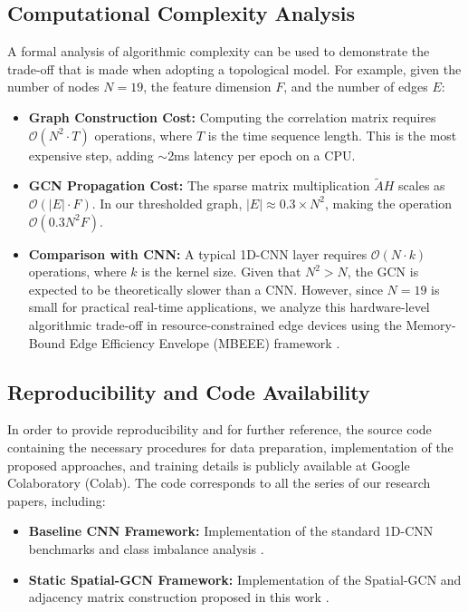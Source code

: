 \documentclass[journal]{IEEEtran}
\begin{document}
\subsection{Computational Complexity Analysis}
A formal analysis of algorithmic complexity can be used to demonstrate the trade-off that is made when adopting a topological model. For example, given the number of nodes $N=19$, the feature dimension $F$, and the number of edges $E$:
\begin{itemize}
    \item \textbf{Graph Construction Cost:} Computing the correlation matrix requires $\mathcal{O}(N^2 \cdot T)$ operations, where $T$ is the time sequence length. This is the most expensive step, adding $\sim$2ms latency per epoch on a CPU.
    \item \textbf{GCN Propagation Cost:} The sparse matrix multiplication $\tilde{A}H$ scales as $\mathcal{O}(|E| \cdot F)$. In our thresholded graph, $|E| \approx 0.3 \times N^2$, making the operation $\mathcal{O}(0.3 N^2 F)$.
    \item \textbf{Comparison with CNN:} A typical 1D-CNN layer requires $\mathcal{O}(N \cdot k)$ operations, where $k$ is the kernel size. Given that $N^2 > N$, the GCN is expected to be theoretically slower than a CNN. However, since $N = 19$ is small for practical real-time applications, we analyze this hardware-level algorithmic trade-off in resource-constrained edge devices using the Memory-Bound Edge Efficiency Envelope (MBEEE) framework \cite{narendra2026}.
\end{itemize}

\subsection{Reproducibility and Code Availability}
In order to provide reproducibility and for further reference, the source code containing the necessary procedures for data preparation, implementation of the proposed approaches, and training details is publicly available at Google Colaboratory (Colab). The code corresponds to all the series of our research papers, including:

\begin{itemize}
    \item \textbf{Baseline CNN Framework:} Implementation of the standard 1D-CNN benchmarks and class imbalance analysis \cite{colab1}.
    \item \textbf{Static Spatial-GCN Framework:} Implementation of the Spatial-GCN and adjacency matrix construction proposed in this work \cite{colab2}.
\end{itemize}
\end{document}
